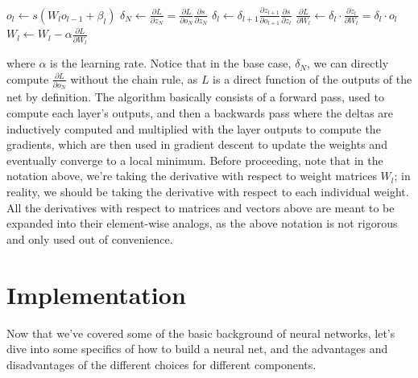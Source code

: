 \documentclass{article}
\begin{document}
\begin{algorithmic}
            \State $ o_l \gets s(W_l o_{l - 1} + \beta_l) $
        \EndFor
        \State $ \delta_N \gets \frac{\partial L}{\partial z_N} = \frac{\partial L}{\partial o_N} \frac{\partial s}{\partial z_N} $
            \State $ \delta_l \gets \delta_{l + 1} \frac{\partial z_{l + 1}}{\partial o_{l + 1}} \frac{\partial s}{\partial z_l} $
            \State $ \frac{\partial L}{\partial W_l} \gets \delta_l \cdot \frac{\partial z_l}{\partial W_l} = \delta_l \cdot o_l $
            \State $ W_l \gets W_l - \alpha \frac{\partial L}{\partial W_l} $
        \EndFor
    \EndProcedure
\end{algorithmic}
where $ \alpha $ is the learning rate. Notice that in the base case, $ \delta_N $, we can directly compute $ \frac{\partial L}{\partial o_N} $ without the chain rule, as $ L $ is a direct function of the outputs of the net by definition. The algorithm basically consists of a forward pass, used to compute each layer's outputs, and then a backwards pass where the deltas are inductively computed and multiplied with the layer outputs to compute the gradients, which are then used in gradient descent to update the weights and eventually converge to a local minimum. Before proceeding, note that in the notation above, we're taking the derivative with respect to weight matrices $ W_l $; in reality, we should be taking the derivative with respect to each individual weight. All the derivatives with respect to matrices and vectors above are meant to be expanded into their element-wise analogs, as the above notation is not rigorous and only used out of convenience.

\section{Implementation}
Now that we've covered some of the basic background of neural networks, let's dive into some specifics of how to build a neural net, and the advantages and disadvantages of the different choices for different components. 
\end{document}
